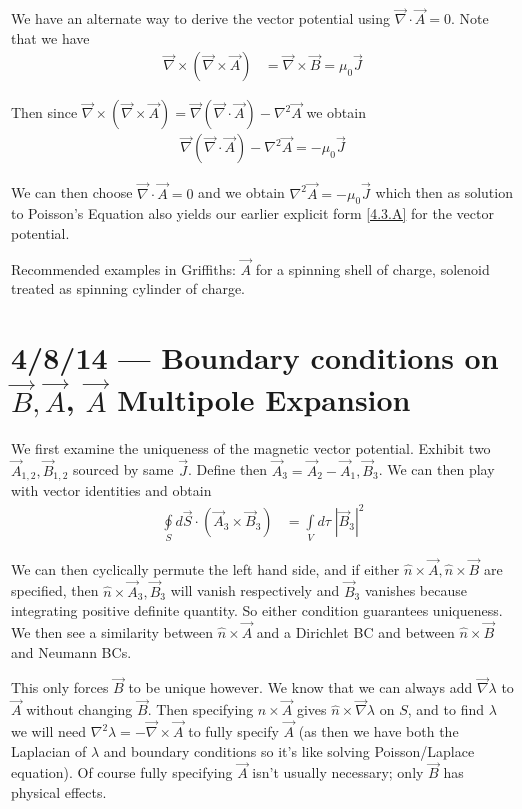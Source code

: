\documentclass[10pt]{report}
\newcommand{\abs}[1]{\left|#1\right|}
\begin{document}
We have an alternate way to derive the vector potential using $\vec{\nabla}\cdot\vec{A} = 0$. Note that we have
\begin{align}
    \vec{\nabla}\times\left(\vec{\nabla}\times\vec{A}\right) &= \vec{\nabla}\times\vec{B} = \mu_0\vec{J}
\end{align}

Then since $\vec{\nabla}\times(\vec{\nabla}\times\vec{A}) = \vec{\nabla}(\vec{\nabla}\cdot\vec{A}) - \nabla^2\vec{A}$ we obtain
\begin{align}
    \vec{\nabla}(\vec{\nabla}\cdot\vec{A}) - \nabla^2\vec{A} = -\mu_0\vec{J}
\end{align}

We can then choose $\vec{\nabla}\cdot\vec{A} = 0$ and we obtain $\nabla^2\vec{A} = -\mu_0\vec{J}$ which then as solution to Poisson's Equation also yields our earlier explicit form \eqref{4.3.A} for the vector potential.

Recommended examples in Griffiths: $\vec{A}$ for a spinning shell of charge, solenoid treated as spinning cylinder of charge.
\chapter{4/8/14 --- Boundary conditions on $\vec{B}, \vec{A}$, $\vec{A}$ Multipole Expansion}

We first examine the uniqueness of the magnetic vector potential. Exhibit two $\vec{A}_{1,2}, \vec{B}_{1,2}$ sourced by same $\vec{J}$. Define then $\vec{A}_3 = \vec{A}_2 - \vec{A}_1, \vec{B}_3$. We can then play with vector identities and obtain
\begin{align}
    \oint\limits_S d\vec{S}\cdot (\vec{A}_3 \times \vec{B}_3) &= \int\limits_{V}^{}d\tau\;\abs{\vec{B}_3}^2
\end{align}

We can then cyclically permute the left hand side, and if either $\hat{n}\times \vec{A}, \hat{n} \times \vec{B}$ are specified, then $\hat{n}\times \vec{A}_3, \vec{B}_3$ will vanish respectively and $\vec{B}_3$ vanishes because integrating positive definite quantity. So either condition guarantees uniqueness. We then see a similarity between $\hat{n}\times \vec{A}$ and a Dirichlet BC and between $\hat{n}\times\vec{B}$ and Neumann BCs.

This only forces $\vec{B}$ to be unique however. We know that we can always add $\vec{\nabla}\lambda$ to $\vec{A}$ without changing $\vec{B}$. Then specifying $\hat{n}\times \vec{A}$ gives $\hat{n}\times \vec{\nabla}\lambda$ on $S$, and to find $\lambda$ we will need $\nabla^2\lambda = -\vec{\nabla}\times \vec{A}$ to fully specify $\vec{A}$ (as then we have both the Laplacian of $\lambda$ and boundary conditions so it's like solving Poisson/Laplace equation). Of course fully specifying $\vec{A}$ isn't usually necessary; only $\vec{B}$ has physical effects.
\end{document}
